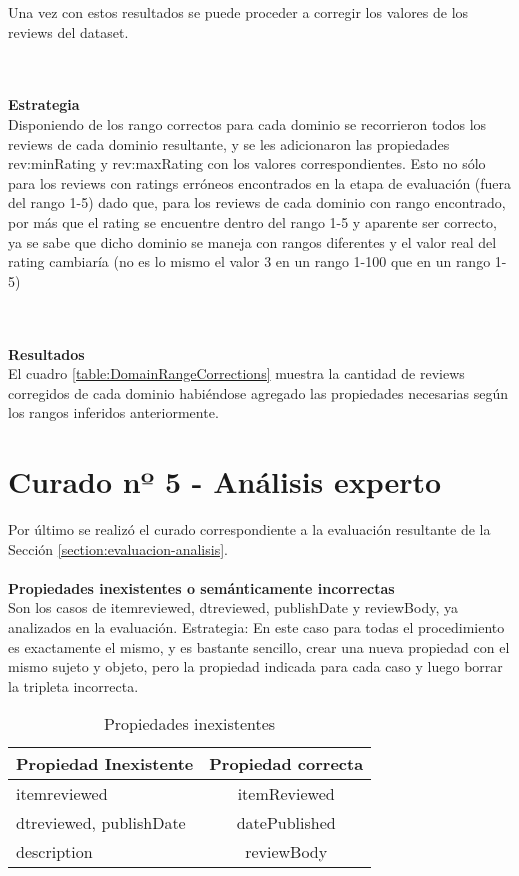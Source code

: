 Una vez con estos resultados se puede proceder a corregir los valores de los reviews del dataset.

~\\\\\textbf{Estrategia}\\
Disponiendo de los rango correctos para cada dominio se recorrieron todos los reviews de cada dominio resultante, y se les adicionaron 
las propiedades rev:minRating y rev:maxRating con los valores correspondientes.
Esto no sólo para los reviews con ratings erróneos encontrados en la etapa de evaluación (fuera del rango 1-5) dado que, para los reviews de 
cada dominio con rango encontrado, por más que el rating se encuentre dentro del rango 1-5 y aparente ser correcto,  ya se sabe que dicho dominio se 
maneja con rangos diferentes y el valor real del rating cambiaría (no es lo mismo el valor 3 en un rango 1-100 que en un rango 1-5)

~\\\\\textbf{Resultados}\\
El cuadro \ref{table:DomainRangeCorrections} muestra la cantidad de reviews corregidos de cada dominio habiéndose agregado las 
propiedades necesarias según los rangos inferidos anteriormente.

\section{Curado nº 5 - Análisis experto}
\label{section:curado-analisis}
\noindent Por último se realizó el curado correspondiente a la evaluación resultante de la Sección \ref{section:evaluacion-analisis}.
\\\\
\textbf{Propiedades inexistentes o semánticamente incorrectas}\\
Son los casos de itemreviewed, dtreviewed, publishDate y reviewBody, ya analizados en la evaluación.
Estrategia: En este caso para todas el procedimiento es exactamente el mismo, y es bastante sencillo, crear una nueva propiedad con 
el mismo sujeto y objeto, pero la propiedad indicada para cada caso y luego borrar la tripleta incorrecta.\\

\begin{table}[h]
\begin{tabular}{| l | c |}\hline
 Propiedad Inexistente & Propiedad correcta \\\hline
 itemreviewed & itemReviewed\\
 dtreviewed, publishDate & datePublished\\
 description & reviewBody\\\hline
\end{tabular}
\caption{Propiedades inexistentes}
\label{table:UndefinedProps}
\end{table}

